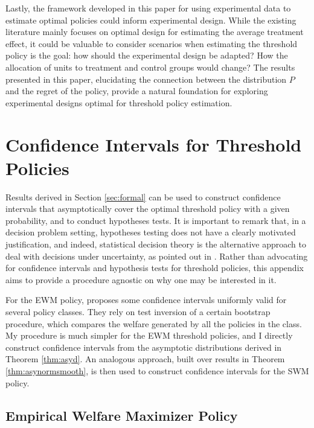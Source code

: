 {Lastly, the framework developed in this paper for using experimental data to estimate optimal policies could inform experimental design. While the existing literature mainly focuses on optimal design for estimating the average treatment effect, it could be valuable to consider scenarios when estimating the threshold policy is the goal: how should the experimental design be adapted? How the allocation of units to treatment and control groups would change? The results presented in this paper, elucidating the connection between the distribution $P$ and the regret of the policy, provide a natural foundation for exploring experimental designs optimal for threshold policy estimation.

\appendix




\section{Confidence Intervals for Threshold Policies} \label{app:ci}

Results derived in Section \ref{sec:formal} can be used to construct confidence intervals that asymptotically cover the optimal threshold policy with a given probability, and to conduct hypotheses tests. It is important to remark that, in a decision problem setting, hypotheses testing does not have a clearly motivated justification, and indeed, statistical decision theory is the alternative approach to deal with decisions under uncertainty, as pointed out in \cite{manski2021econometrics}. Rather than advocating for confidence intervals and hypothesis tests for threshold policies, this appendix aims to provide a procedure agnostic on why one may be interested in it.

For the EWM policy, \cite{rai2018statistical} proposes some confidence intervals uniformly valid for several policy classes. They rely on test inversion of a certain bootstrap procedure, which compares the welfare generated by all the policies in the class. My procedure is much simpler for the EWM threshold policies, and I directly construct confidence intervals from the asymptotic distributions derived in Theorem \ref{thm:asyd}. An analogous approach, built over results in Theorem \ref{thm:asynormsmooth}, is then used to construct confidence intervals for the SWM policy.

\subsection{Empirical Welfare Maximizer Policy}

}
